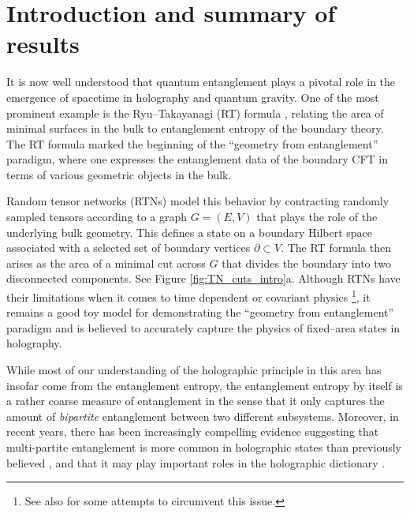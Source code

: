 \documentclass[11pt,oneside,letterpaper]{article}
\numberwithin{equation}{section}
\theoremstyle{definition}
\theoremstyle{remark}
\begin{document}
\pagebreak
\pagestyle{plain}

\setcounter{tocdepth}{2}
{}
\vfill
\tableofcontents

\newpage

\section{Introduction and summary of results}

It is now well understood that quantum entanglement plays a pivotal role in the emergence of spacetime in holography and quantum gravity. One of the most prominent example is the Ryu--Takayanagi (RT) formula \cite{Ryu:2006bv,Ryu:2006ef}, relating the area of minimal surfaces in the bulk to entanglement entropy of the boundary theory. The RT formula marked the beginning of the ``geometry from entanglement'' paradigm, where one expresses the entanglement data of the boundary CFT in terms of various  geometric objects in the bulk\cite{Hubeny:2007xt,Dong:2016fnf,Takayanagi:2017knl,Umemoto:2018jpc,Bao:2019zqc,Dutta:2019gen,Dong:2021clv,Nakata:2020luh}.

Random tensor networks (RTNs) \cite{Collins:2013ubu,Hayden:2016cfa} model this behavior by contracting randomly sampled tensors according to a graph $G=(E,V)$ that plays the role of the underlying bulk geometry. This defines a state on a boundary Hilbert space associated with a selected set of boundary vertices $\partial\subset V$. The RT formula then arises as the area of a minimal cut across $G$ that divides the boundary into two disconnected components. See Figure \ref{fig:TN_cuts_intro}a. Although RTNs have their limitations when it comes to time dependent or covariant physics \cite{Dolev:2021ofc,Faist:2019ahr,Engelhardt:2023bpv}\footnote{See also \cite{Apel:2021tnn,Kohler:2018kqk,Balasubramanian:2025rcr} for some attempts to circumvent this issue.}, it remains a good toy model for demonstrating the ``geometry from entanglement'' paradigm and is believed to accurately capture the physics of fixed--area states \cite{Akers:2018fow,Dong:2018seb} in holography.

While most of our understanding of the holographic principle in this area has insofar come from the entanglement entropy, the entanglement entropy by itself is a rather coarse measure of entanglement in the sense that it only captures the amount of \emph{bipartite} entanglement between two different subsystems. Moreover, in recent years, there has been increasingly compelling evidence suggesting that multi-partite entanglement is more common in holographic states than previously believed \cite{Akers:2019gcv,Harper:2021uuq,Li:2025nxv}, and that it may play important roles in the holographic dictionary \cite{Iizuka:2025bcc}.
\end{document}
